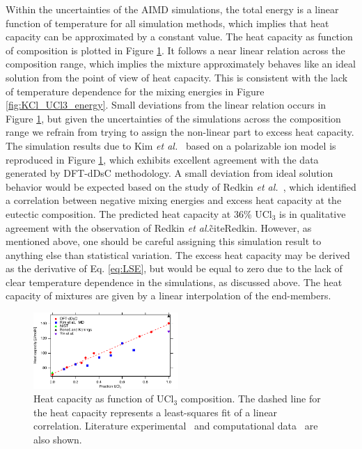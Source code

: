 \documentclass[preprint,3p,10pt,twocolumn,number,sort&compress]{elsarticle}
\begin{document}
Within the uncertainties of the AIMD simulations, the total energy is a linear function of temperature for all simulation methods, which implies that heat capacity can be approximated by a constant value. The heat capacity as function of composition is plotted in Figure \ref{fig:heat_capacity}. It follows a near linear relation across the composition range, which implies the mixture approximately behaves like an ideal solution from the point of view of heat capacity. This is consistent with the lack of temperature dependence for the mixing energies in Figure \ref{fig:KCl_UCl3_energy}. Small deviations from the linear relation occurs in Figure \ref{fig:heat_capacity}, but given the uncertainties of the simulations across the composition range we refrain from trying to assign the non-linear part to excess heat capacity. The simulation results due to Kim \textit{et al.}~\cite{Kim} based on a polarizable ion model is reproduced in Figure \ref{fig:heat_capacity}, which exhibits excellent agreement with the data generated by DFT-dDsC methodology. A small deviation from ideal solution behavior would be expected based on the study of Redkin \textit{et al.}~\cite{Redkin}, which identified a correlation between negative mixing energies and excess heat capacity at the eutectic composition. The predicted heat capacity at 36\% UCl$_3$ is in qualitative agreement with the observation of Redkin \textit{et al.}\~cite{Redkin}. However, as mentioned above, one should be careful assigning this simulation result to anything else than statistical variation. The excess heat capacity may be derived as the derivative of Eq. \ref{eq:LSE}, but would be equal to zero due to the lack of clear temperature dependence in the simulations, as discussed above. The heat capacity of mixtures are given by a linear interpolation of the end-members. 

\begin{figure}[htb]
\centering
\includegraphics[width=0.49\textwidth]{KCl_UCl3_cp.pdf}
\caption{Heat capacity as function of UCl$_3$ composition. The dashed line for the heat capacity represents a least-squares fit of a linear correlation. Literature experimental~\cite{NIST,219851,YIN2020,BENES2008} and computational data~\cite{Kim} are also shown.}
\label{fig:heat_capacity}
\end{figure}
\end{document}
